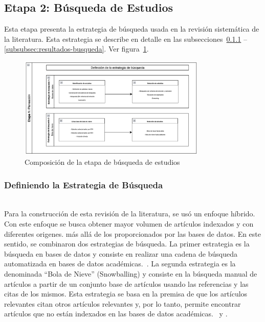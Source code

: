 \subsection{Etapa 2: Búsqueda de Estudios}
Esta etapa presenta la estrategia de búsqueda usada en la revisión sistemática de la literatura. Esta estrategia se describe en detalle en las subsecciones~\ref{subsubsec:Definiendo la Estrategia de Busqueda} -- \ref{subsubsec:resultados-busqueda}. Ver figura~\ref{fig:etapa2}.

\begin{figure}[tbp]
    \centering
    \includegraphics[width=0.8\textwidth]{resources/images/planeacion/estrategias-busqueda.png}
    \caption{Composición de la etapa de búsqueda de estudios}\label{fig:etapa2}
\end{figure}

\subsubsection{Definiendo la Estrategia de Búsqueda}\label{subsubsec:Definiendo la Estrategia de Busqueda}
\mbox{}\\
Para la construcción de esta revisión de la literatura, se usó un enfoque híbrido. Con este enfoque se busca obtener mayor volumen de artículos indexados y con diferentes origenes. más allá de los proporcionados por las bases de datos.
En este sentido, se combinaron dos estrategias de búsqueda. La primer estrategia es la búsqueda en bases de datos y consiste en realizar una cadena de búsqueda automatizada en bases de datos académicas.~\cite{jalali2012systematic}.
La segunda estrategia es la denominada ``Bola de Nieve'' (Snowballing) y consiste en la búsqueda manual de artículos a partir de un conjunto base de artículos usando las referencias y las citas de los mismos. Esta estrategia se basa en la premisa de que los artículos relevantes citan otros artículos relevantes y, por lo tanto, permite encontrar artículos que no están indexados en las bases de datos académicas.~\cite{jalali2012systematic} y \cite{goodman1961snowball}.
\mbox{}\\
